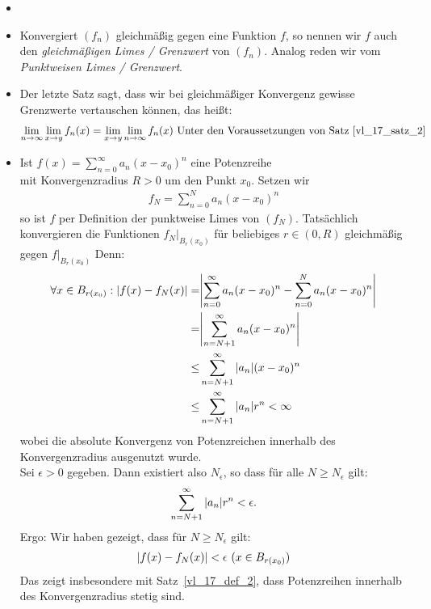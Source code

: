 \begin{Bemerkung}{
	\begin{itemize}
		\item[ ]
		\item Konvergiert $(f_n)$ gleichmäßig gegen eine Funktion $f$, 
		so nennen wir $f$ auch den \emph{gleichmäßigen Limes / Grenzwert} 
		von $(f_n)$. Analog reden wir vom \emph{Punktweisen Limes / Grenzwert}.
		\item Der letzte Satz sagt, dass wir bei gleichmäßiger Konvergenz gewisse 
		Grenzwerte vertauschen können, das heißt:
		\begin{align*}
			\lim\limits_{n\rightarrow \infty}{\lim\limits_{x \rightarrow y}{f_n(x)}} = \lim\limits_{x \rightarrow y}{\lim\limits_{n \rightarrow \infty}
			{f_n(x)}}
			\text{ Unter den Voraussetzungen von Satz~\ref{vl_17_satz_2}}
		\end{align*}
		\item Ist $f(x) = \sum_{n = 0}^{\infty} a_n (x-x_0)^n$ eine Potenzreihe \\
		mit Konvergenzradius $R > 0$ um den Punkt $x_0$. Setzen wir 
		\begin{align*}
			f_N = \sum_{n = 0}^N a_n (x-x_0)^n
		\end{align*}
		so ist $f$ per Definition der punktweise Limes von $(f_N)$.
		Tatsächlich konvergieren die Funktionen $f_N\vert_{B_r(x_0)}$ für 
		beliebiges $r \in (0,R)$ gleichmäßig gegen $f\vert_{B_r(x_0)}$ 
		Denn:
		\begin{align*}
			\forall x \in B_{r (x_0)} : \abs{f(x)- f_N(x) } 
			=&\abs{ \sum_{n=0}^{\infty} a_n (x-x_0)^n - \sum_{n=0}^N a_n (x-x_0)^n} \\
			= & \abs{\sum_{n = N+1 }^{\infty} a_n (x-x_0)^n} \\
			\leq & \sum_{n = N+1}^{\infty} \abs{a_n}(x-x_0)^n \\
			\leq & \sum_{n = N +1}^{\infty} \abs{a_n} r^n < \infty
		\end{align*}
		wobei die absolute Konvergenz von Potenzreichen innerhalb des 
		Konvergenzradius ausgenutzt wurde. \\
		Sei $\epsilon > 0$ gegeben. Dann existiert also $N_{\epsilon}$, so dass 
		für alle $N \geq N_{\epsilon}$ gilt:
		\begin{align*}
			\sum_{n = N+1}^{\infty}\abs{a_n}r^n < \epsilon.
		\end{align*}
		Ergo: Wir haben gezeigt, dass für $N \geq N_{\epsilon}$ gilt:
		\begin{align*}
			\abs{f(x) - f_N(x)} < \epsilon \text{ } (x \in B_{r(x_0)})
		\end{align*}
		Das zeigt insbesondere mit Satz~\ref{vl_17_def_2},  
		 dass Potenzreihen innerhalb des Konvergenzradius stetig sind.
	\end{itemize}
}\end{Bemerkung}

